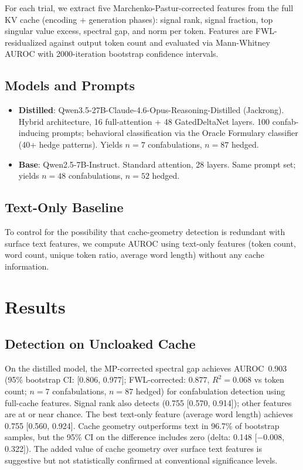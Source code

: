 \documentclass[11pt,a4paper]{article}
\begin{document}
For each trial, we extract five Marchenko-Pastur-corrected features from
the full KV cache (encoding + generation phases): signal rank, signal
fraction, top singular value excess, spectral gap, and norm per token.
Features are FWL-residualized against output token count and evaluated
via Mann-Whitney AUROC with 2000-iteration bootstrap confidence
intervals.

\subsection{Models and Prompts}

\begin{itemize}
\item \textbf{Distilled}: Qwen3.5-27B-Claude-4.6-Opus-Reasoning-Distilled
(Jackrong). Hybrid architecture, 16 full-attention + 48 GatedDeltaNet
layers. 100 confab-inducing prompts; behavioral classification via the
Oracle Formulary classifier (40+ hedge patterns). Yields $n=7$
confabulations, $n=87$ hedged.

\item \textbf{Base}: Qwen2.5-7B-Instruct. Standard attention, 28
layers. Same prompt set; yields $n=48$ confabulations, $n=52$ hedged.
\end{itemize}

\subsection{Text-Only Baseline}

To control for the possibility that cache-geometry detection is
redundant with surface text features, we compute AUROC using text-only
features (token count, word count, unique token ratio, average word
length) without any cache information.

\section{Results}

\subsection{Detection on Uncloaked Cache}

On the distilled model, the MP-corrected spectral gap achieves
AUROC~0.903 (95\% bootstrap CI: [0.806, 0.977]; FWL-corrected: 0.877,
$R^2 = 0.068$ vs token count; $n=7$ confabulations, $n=87$ hedged)
for confabulation detection using full-cache features. Signal rank
also detects (0.755 [0.570, 0.914]); other features are at or near
chance. The best text-only feature (average word length) achieves
0.755 [0.560, 0.924]. Cache geometry outperforms text in 96.7\% of
bootstrap samples, but the 95\% CI on the difference includes zero
(delta: 0.148 [$-$0.008, 0.322]). The added value of cache geometry
over surface text features is suggestive but not statistically
confirmed at conventional significance levels.
\end{document}
